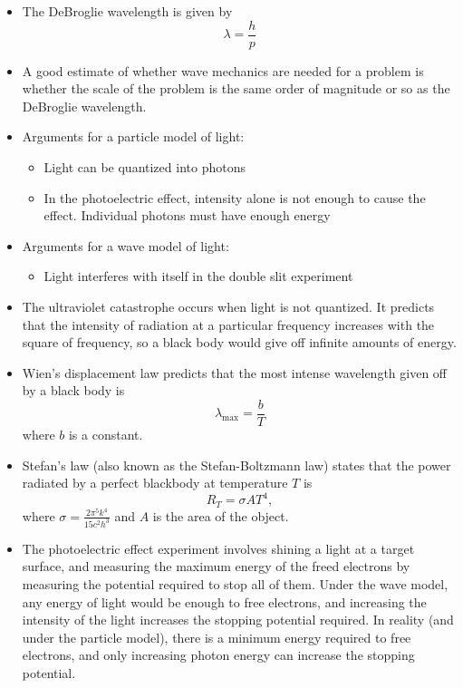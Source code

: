 \documentclass{article}
\begin{document}
    \begin{itemize}
        \item The DeBroglie wavelength is given by
        \begin{equation*}
            \lambda = \frac{h}{p}
        \end{equation*}
        \item A good estimate of whether wave mechanics are needed for a problem is whether the scale of the problem is the same order of magnitude or so as the DeBroglie wavelength.
        \item Arguments for a particle model of light:
        \begin{itemize}
            \item Light can be quantized into photons
            \item In the photoelectric effect, intensity alone is not enough to cause the effect. Individual photons must have enough energy
        \end{itemize}
        \item Arguments for a wave model of light:
        \begin{itemize}
            \item Light interferes with itself in the double slit experiment
        \end{itemize}
        \item The ultraviolet catastrophe occurs when light is not quantized. It predicts that the intensity of radiation at a particular frequency increases with the square of frequency, so a black body would give off infinite amounts of energy.
        \item Wien's displacement law predicts that the most intense wavelength given off by a black body is
        \begin{equation*}
            \lambda_{\text{max}} = \frac{b}{T}
        \end{equation*}
        where $b$ is a constant.
        \item Stefan's law (also known as the Stefan-Boltzmann law) states that the power radiated by a perfect blackbody at temperature $T$ is
        \begin{equation*}
            R_T = \sigma A T^4,
        \end{equation*}
        where $\sigma = \frac{2\pi^5k^4}{15c^2h^3}$ and $A$ is the area of the object.
        \item The photoelectric effect experiment involves shining a light at a target surface, and measuring the maximum energy of the freed electrons by measuring the potential required to stop all of them. Under the wave model, any energy of light would be enough to free electrons, and increasing the intensity of the light increases the stopping potential required. In reality (and under the particle model), there is a minimum energy required to free electrons, and only increasing photon energy can increase the stopping potential.

\end{itemize}
\end{document}
